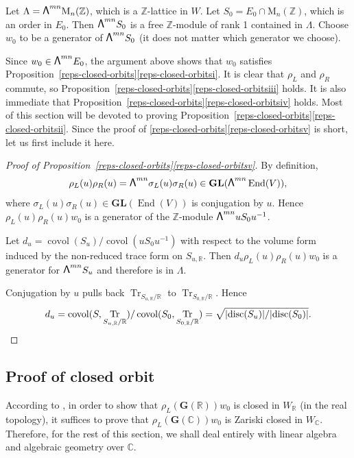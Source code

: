 \documentclass[JEP,XML,SOM,Unicode,NoFloatCountersInSection]{cedram}
\newcommand\bw{{\hbox{\large$\mathsf{\Lambda}$}}}
\newcommand{\bC}{\mathbb{C}}
\newcommand{\bR}{\mathbb{R}}
\newcommand{\bZ}{\mathbb{Z}}
\newcommand{\gG}{\mathbf{G}}
\newcommand{\gGL}{\mathbf{GL}}
\newcommand{\rM}{\mathrm{M}}
\DeclareMathOperator{\covol}{covol}
\DeclareMathOperator{\disc}{disc}
\DeclareMathOperator{\End}{End}
\DeclareMathOperator{\Tr}{Tr}
\newcommand{\abs}[1]{\lvert #1 \rvert}
\let\extpower\bw
\begin{document}
Let $\Lambda = \extpower^{mn} \rM_n(\bZ)$, which is a $\bZ$-lattice in $W$.
Let $S_0 = E_0 \cap \rM_n(\bZ)$, which is an order in $E_0$.
Then $\extpower^{mn} S_0$ is a free $\bZ$-module of rank 1 contained in $\Lambda$.
Choose $w_0$ to be a generator of $\extpower^{mn} S_0$ (it does not matter which generator we choose).

Since $w_0 \in \extpower^{mn} E_0$, the argument above shows that $w_0$ satisfies Proposition~\ref{reps-closed-orbits}\eqref{reps-closed-orbitsi}.
It is clear that $\rho_L$ and $\rho_R$ commute, so Proposition~\ref{reps-closed-orbits}\eqref{reps-closed-orbitsiii} holds.
It is also immediate that Proposition~\ref{reps-closed-orbits}\eqref{reps-closed-orbitsiv} holds.
Most of this section will be devoted to proving Proposition~\ref{reps-closed-orbits}\eqref{reps-closed-orbitsii}.
Since the proof of \ref{reps-closed-orbits}\eqref{reps-closed-orbitsv} is short, let us first include it here.

\begin{proof}[Proof of Proposition~\ref{reps-closed-orbits}\eqref{reps-closed-orbitsv}]
By definition,
\[
\rho_L(u) \rho_R(u) = \extpower^{mn} \sigma_L(u)\sigma_R(u) \in \gGL(\extpower^{mn} \End(V)),
\]
where $\sigma_L(u)\sigma_R(u) \in \gGL(\End(V))$ is conjugation by $u$.
Hence $\rho_L(u)\rho_R(u)w_0$ is a generator of the $\bZ$-module $\extpower^{mn} uS_0u^{-1}$.

Let $d_u = \covol(S_u)/\covol(uS_0u^{-1})$ with respect to the volume form induced by the non-reduced trace form on $S_{u,\bR}$.
Then $d_u\rho_L(u)\rho_R(u)w_0$ is a generator for $\extpower^{mn} S_u$ and therefore is in $\Lambda$.

Conjugation by $u$ pulls back $\Tr_{S_{u,\bR}/\bR}$ to $\Tr_{S_{0,\bR}/\bR}$.
Hence
\[
d_u = \covol(S, \Tr_{S_{u,\bR}/\bR})/\covol(S_0, \Tr_{S_{0,\bR}/\bR}) = \sqrt{\abs{\disc(S_u)}/\abs{\disc(S_0)}}.
\qedhere
\]
\end{proof}

\subsection{Proof of closed orbit}

According to \cite[Prop.\,6.3]{BHC62}, in order to show that $\rho_L(\gG(\bR))w_0$ is closed in $W_\bR$ (in the real topology), it suffices to prove that $\rho_L(\gG(\bC))w_0$ is Zariski closed in $W_\bC$.
Therefore, for the rest of this section, we shall deal entirely with linear algebra and algebraic geometry over $\bC$.
\end{document}
